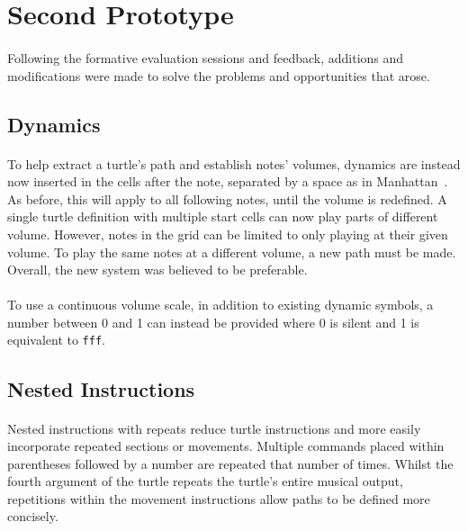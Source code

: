 \section{Second Prototype}

\paragraph{} Following the formative evaluation sessions and feedback, additions and modifications were made to solve the problems and opportunities that arose.

\subsection{Dynamics}

\paragraph{} To help extract a turtle's path and establish notes' volumes, dynamics are instead now inserted in the cells after the note, separated by a space as in Manhattan~\cite{nash:manhattan}. As before, this will apply to all following notes, until the volume is redefined. A single turtle definition with multiple start cells can now play parts of different volume. However, notes in the grid can be limited to only playing at their given volume. To play the same notes at a different volume, a new path must be made. Overall, the new system was believed to be preferable.

\paragraph{} To use a continuous volume scale, in addition to existing dynamic symbols, a number between 0 and 1 can instead be provided where 0 is silent and 1 is equivalent to \texttt{fff}.

\subsection{Nested Instructions}

\paragraph{} Nested instructions with repeats reduce turtle instructions and more easily incorporate repeated sections or movements. Multiple commands placed within parentheses followed by a number are repeated that number of times. Whilst the fourth argument of the turtle repeats the turtle's entire musical output, repetitions within the movement instructions allow paths to be defined more concisely.

